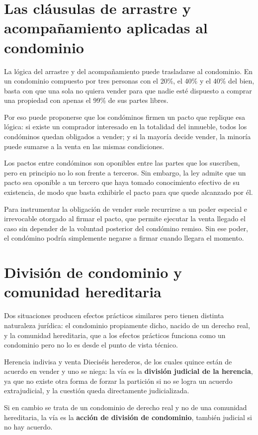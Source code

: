 \documentclass[12pt,oneside]{book}
\begin{document}
\section{Las cláusulas de arrastre y acompañamiento aplicadas al condominio}

La lógica del arrastre y del acompañamiento puede trasladarse al condominio. En un condominio compuesto por tres personas con el 20\%, el 40\% y el 40\% del bien, basta con que una sola no quiera vender para que nadie esté dispuesto a comprar una propiedad con apenas el 99\% de sus partes libres.

Por eso puede proponerse que los condóminos firmen un pacto que replique esa lógica: si existe un comprador interesado en la totalidad del inmueble, todos los condóminos quedan obligados a vender; y si la mayoría decide vender, la minoría puede sumarse a la venta en las mismas condiciones.

\begin{important}
Los pactos entre condóminos son oponibles entre las partes que los suscriben, pero en principio no lo son frente a terceros. Sin embargo, la ley admite que un pacto sea oponible a un tercero que haya tomado conocimiento efectivo de su existencia, de modo que basta exhibirle el pacto para que quede alcanzado por él.
\end{important}

Para instrumentar la obligación de vender suele recurrirse a un poder especial e irrevocable otorgado al firmar el pacto, que permite ejecutar la venta llegado el caso sin depender de la voluntad posterior del condómino remiso. Sin ese poder, el condómino podría simplemente negarse a firmar cuando llegara el momento.

\section{División de condominio y comunidad hereditaria}

Dos situaciones producen efectos prácticos similares pero tienen distinta naturaleza jurídica: el condominio propiamente dicho, nacido de un derecho real, y la comunidad hereditaria, que a los efectos prácticos funciona como un condominio pero no lo es desde el punto de vista técnico.

\begin{example}{Herencia indivisa y venta}
Dieciséis herederos, de los cuales quince están de acuerdo en vender y uno se niega: la vía es la \textbf{división judicial de la herencia}, ya que no existe otra forma de forzar la partición si no se logra un acuerdo extrajudicial, y la cuestión queda directamente judicializada.

Si en cambio se trata de un condominio de derecho real y no de una comunidad hereditaria, la vía es la \textbf{acción de división de condominio}, también judicial si no hay acuerdo.
\end{example}
\end{document}
